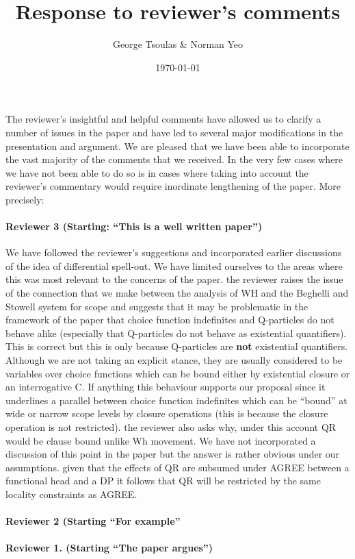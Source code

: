 \documentclass[11pt]{article}
\begin{document}
\title{Response to reviewer's comments}
\author{George Tsoulas \& Norman Yeo}
\date{\today}

\maketitle


The reviewer's insightful and helpful comments have allowed us to clarify a number of issues in the paper and have led to several major modifications in the presentation and argument.  We are pleased that we have been able to incorporate the vast majority of the comments that we received.  In the very few cases where we have not been able to do so is in cases where taking into account the reviewer's commentary would require inordinate lengthening of the paper.  More precisely:

\paragraph{Reviewer 3 (Starting: ``This is a well written paper'')}  We have followed the reviewer's suggestions and incorporated earlier discussions of the idea of differential spell-out.  We have limited ourselves to the areas where this was most relevant to the concerns of the paper.  the reviewer raises the issue of the connection that we make between the analysis of WH and the Beghelli and Stowell system for scope and suggests that it may be problematic in the framework of the paper that choice function  indefinites and Q-particles do not behave alike (especially that Q-particles do not behave as existential quantifiers).  This is correct but this is only because Q-particles are \textbf{not} existential quantifiers.  Although we are not taking an explicit stance, they are usually considered to be variables over choice functions which can be bound either by existential closure or an interrogative C.  If anything this behaviour supports our proposal since it underlines a parallel between choice function indefinites which can be ``bound'' at wide or narrow scope levels by closure operations (this is because the closure operation is not restricted).
the reviewer also asks why, under this account QR would be clause bound unlike Wh movement.  We have not incorporated a discussion of this point in the paper but the answer is rather obvious under our assumptions.  given that the effects of QR are subsumed under AGREE between a functional head and a DP it follows that QR will be restricted by the same locality constraints as AGREE.

\paragraph{Reviewer 2 (Starting ``For example''} 
\paragraph{Reviewer 1.  (Starting ``The paper argues'')}
\end{document}
